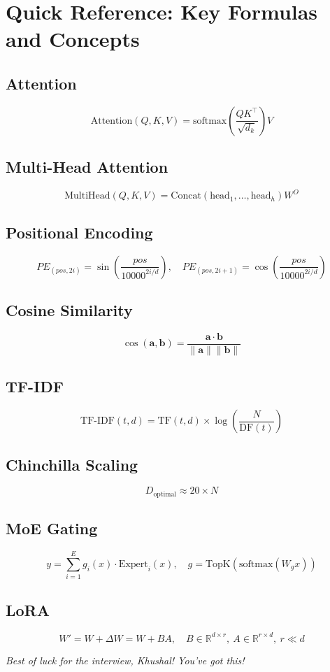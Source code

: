 \documentclass[11pt,a4paper]{article}
\begin{document}
\newpage
\section{Quick Reference: Key Formulas and Concepts}

\subsection{Attention}
\[
\text{Attention}(Q,K,V) = \text{softmax}\!\left(\frac{QK^\top}{\sqrt{d_k}}\right) V
\]

\subsection{Multi-Head Attention}
\[
\text{MultiHead}(Q,K,V) = \text{Concat}(\text{head}_1, \dots, \text{head}_h) W^O
\]

\subsection{Positional Encoding}
\[
PE_{(pos,2i)} = \sin\!\left(\frac{pos}{10000^{2i/d}}\right), \quad PE_{(pos,2i+1)} = \cos\!\left(\frac{pos}{10000^{2i/d}}\right)
\]

\subsection{Cosine Similarity}
\[
\cos(\mathbf{a}, \mathbf{b}) = \frac{\mathbf{a} \cdot \mathbf{b}}{\|\mathbf{a}\| \|\mathbf{b}\|}
\]

\subsection{TF-IDF}
\[
\text{TF-IDF}(t,d) = \text{TF}(t,d) \times \log\!\left(\frac{N}{\text{DF}(t)}\right)
\]

\subsection{Chinchilla Scaling}
\[
D_{\text{optimal}} \approx 20 \times N
\]

\subsection{MoE Gating}
\[
y = \sum_{i=1}^{E} g_i(x) \cdot \text{Expert}_i(x), \quad g = \text{TopK}(\text{softmax}(W_g x))
\]

\subsection{LoRA}
\[
W' = W + \Delta W = W + BA, \quad B \in \mathbb{R}^{d \times r},\ A \in \mathbb{R}^{r \times d},\ r \ll d
\]

\vspace{1cm}
\begin{center}
\textit{Best of luck for the interview, Khushal! You've got this!}
\end{center}
\end{document}
